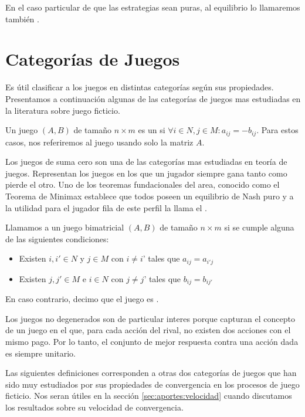 En el caso particular de que las estrategias sean puras, al equilibrio lo llamaremos también .


\section{Categorías de Juegos}

Es útil clasificar a los juegos en distintas categorías según sus propiedades. Presentamos a continuación algunas de las categorías de juegos mas estudiadas en la literatura sobre juego ficticio.

\begin{definition}
    Un juego $(A, B)$ de tamaño $n \times m$ es un  si $\forall i \in N, j \in M : a_{ij} = -b_{ij}$. Para estos casos, nos referiremos al juego usando solo la matriz $A$.
\end{definition}

Los juegos de suma cero son una de las categorías mas estudiadas en teoría de juegos. Representan los juegos en los que un jugador siempre gana tanto como pierde el otro. Uno de los teoremas fundacionales del area, conocido como el Teorema de Minimax \cite{nash:minmax} establece que todos poseen un equilibrio de Nash puro y a la utilidad para el jugador fila de este perfil la llama el .

\begin{definition}
    Llamamos  a un juego bimatricial $(A, B)$ de tamaño $n \times m$ si se cumple alguna de las siguientes condiciones:
    \begin{itemize}
        \item Existen $i, i' \in N$ y $j \in M$ con $i \neq i$' tales que $a_{ij} = a_{i'j}$
        \item Existen $j, j' \in M$ e $i \in N$ con $j \neq j$' tales que $b_{ij} = b_{ij'}$
    \end{itemize}
    En caso contrario, decimo que el juego es .
\end{definition}
Los juegos no degenerados son de particular interes porque capturan el concepto de un juego en el que, para cada acción del rival, no existen dos acciones con el mismo pago. Por lo tanto, el conjunto de mejor respuesta contra una acción dada es siempre unitario.

Las siguientes definiciones corresponden a otras dos categorías de juegos que han sido muy estudiados por sus propiedades de convergencia en los procesos de juego ficticio. Nos seran útiles en la sección \ref{sec:aportes:velocidad} cuando discutamos los resultados sobre su velocidad de convergencia.

